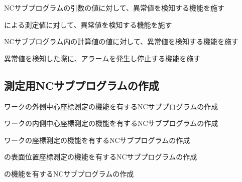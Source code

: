\begin{enumerate}[label*={\sarrow[red]}]
\item NCサブプログラムの引数の値に対して、異常値を検知する機能を施す
\item \TouchSensorProbe による測定値に対して、異常値を検知する機能を施す
\item NCサブプログラム内の計算値の値に対して、異常値を検知する機能を施す
\item 異常値を検知した際に、アラームを発生し停止する機能を施す
\end{enumerate}



\clearpage


\subsection{測定用NCサブプログラムの作成}
\begin{enumerate}[label={\sarrow[red]}]
\item ワークの外側中心座標測定の機能を有するNCサブプログラムの作成
\item ワークの内側中心座標測定の機能を有するNCサブプログラムの作成
\item ワークの\OutcutCenter 座標測定の機能を有するNCサブプログラムの作成
\item \Dimple の表面位置座標測定の機能を有するNCサブプログラムの作成
\item \CenterlineEndFaceDifMeasurement の機能を有するNCサブプログラムの作成
\end{enumerate}


